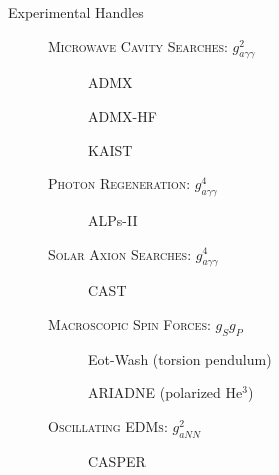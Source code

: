 \documentclass{beamer}
\begin{document}
\begin{frame}{Experimental Handles}

 \begin{description}
\item[ ] \textsc{Microwave Cavity Searches}: {\tiny $g_{a\gamma\gamma}^2$}
\begin{description}
\item[ ]  ADMX
\item[ ]  ADMX-HF
\item[ ]  KAIST
\end{description}

\item[ ] \textsc{Photon Regeneration}: {\tiny $g_{a\gamma\gamma}^4$}
\begin{description}
\item[ ]  ALPs-II
\end{description}
\item[ ] \textsc{Solar Axion Searches}: {\tiny $g_{a\gamma\gamma}^4$}
\begin{description}
\item[ ]  CAST 
\end{description}
\item[ ] \textsc{Macroscopic Spin Forces}: {\tiny $g_S g_P$}
\begin{description}
\item[ ]  Eot-Wash {\tiny (torsion pendulum)}
\item[] ARIADNE {\tiny (polarized He$^3$)}
\end{description}
\item[ ] \textsc{Oscillating EDMs}: {\tiny $g_{aNN}^2$}
\begin{description}
\item[ ]  CASPER
\end{description}
\end{description}
\end{frame}
\end{document}
